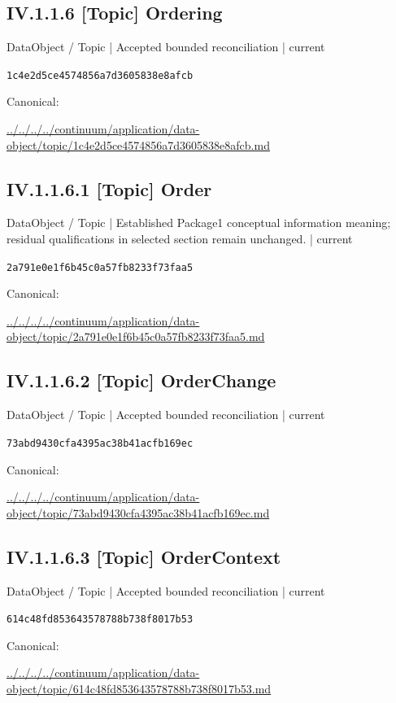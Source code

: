\documentclass[10pt,a4paper]{article}
\begin{document}
\subsection*{IV.1.1.6 [Topic] Ordering}
\label{element-1c4e2d5ce4574856a7d3605838e8afcb}
{\small DataObject / Topic | Accepted bounded reconciliation | current}\par
\texttt{1c4e2d5ce4574856a7d3605838e8afcb}\par
Canonical: \par
{\footnotesize\url{../../../../continuum/application/data-object/topic/1c4e2d5ce4574856a7d3605838e8afcb.md}}\par
\subsection*{IV.1.1.6.1 [Topic] Order}
\label{element-2a791e0e1f6b45c0a57fb8233f73faa5}
{\small DataObject / Topic | Established Package1 conceptual information meaning; residual qualifications in selected section remain unchanged. | current}\par
\texttt{2a791e0e1f6b45c0a57fb8233f73faa5}\par
Canonical: \par
{\footnotesize\url{../../../../continuum/application/data-object/topic/2a791e0e1f6b45c0a57fb8233f73faa5.md}}\par
\subsection*{IV.1.1.6.2 [Topic] OrderChange}
\label{element-73abd9430cfa4395ac38b41acfb169ec}
{\small DataObject / Topic | Accepted bounded reconciliation | current}\par
\texttt{73abd9430cfa4395ac38b41acfb169ec}\par
Canonical: \par
{\footnotesize\url{../../../../continuum/application/data-object/topic/73abd9430cfa4395ac38b41acfb169ec.md}}\par
\subsection*{IV.1.1.6.3 [Topic] OrderContext}
\label{element-614c48fd853643578788b738f8017b53}
{\small DataObject / Topic | Accepted bounded reconciliation | current}\par
\texttt{614c48fd853643578788b738f8017b53}\par
Canonical: \par
{\footnotesize\url{../../../../continuum/application/data-object/topic/614c48fd853643578788b738f8017b53.md}}\par
\end{document}
